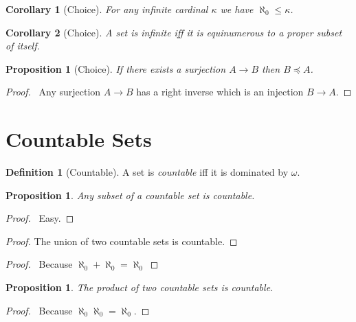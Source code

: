 \documentclass{article}
\let\qed\relax
\newtheorem{proposition}[axiom]{Proposition}
\newtheorem{corollary}{Corollary}[axiom]
\theoremstyle{definition}
\newtheorem{definition}[axiom]{Definition}
\begin{document}
    \begin{corollary}[Choice]
        For any infinite cardinal $\kappa$ we have $\aleph_0 \leq \kappa$.
    \end{corollary}

    \begin{corollary}[Choice]
        A set is infinite iff it is equinumerous to a proper subset of itself.
    \end{corollary}
    
    \begin{proposition}[Choice]
        If there exists a surjection $A \rightarrow B$ then $B \preccurlyeq A$.
    \end{proposition}

    \begin{proof}
        \pf\ Any surjection $A \rightarrow B$ has a right inverse which is an injection $B \rightarrow A$.
    \end{proof}
    \section{Countable Sets}

    \begin{definition}[Countable]
        A set is \emph{countable} iff it is dominated by $\omega$.
    \end{definition}

    \begin{proposition}
        Any subset of a countable set is countable.
    \end{proposition}

    \begin{proof}
        \pf\ Easy. \qed
    \end{proof}

    \begin{proof}
        The union of two countable sets is countable.
    \end{proof}

    \begin{proof}
        \pf\ Because $\aleph_0 + \aleph_0 = \aleph_0$ \qed
    \end{proof}

    \begin{proposition}
        The product of two countable sets is countable.
    \end{proposition}

    \begin{proof}
        \pf\ Because $\aleph_0 \aleph_0 = \aleph_0$. \qed
    \end{proof}
\end{document}
